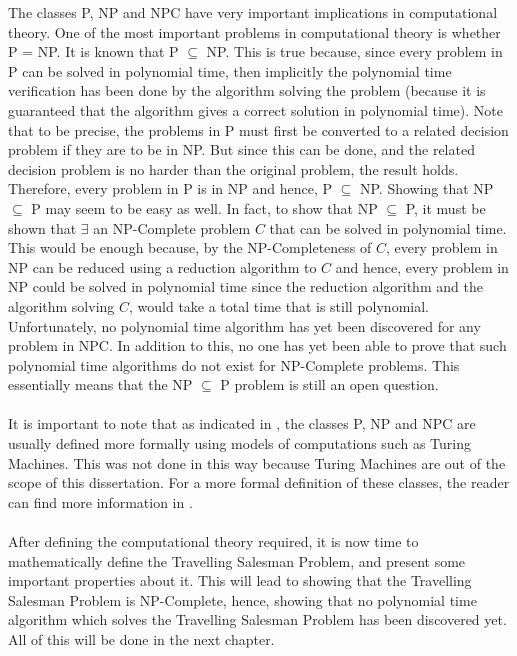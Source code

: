 \documentclass[12pt]{article}
\numberwithin{equation}{subsection}
\numberwithin{table}{subsection}
\numberwithin{algorithm}{subsection}
\numberwithin{figure}{subsection}
\begin{document}
The classes P, NP and NPC have very important implications in computational theory. One of the most important problems in computational theory is whether P = NP. It is known that P $\subseteq$ NP. This is true because, since every problem in P can be solved in polynomial time, then implicitly the polynomial time verification has been done by the algorithm solving the problem (because it is guaranteed that the algorithm gives a correct solution in polynomial time). Note that to be precise, the problems in P must first be converted to a related decision problem if they are to be in NP. But since this can be done, and the related decision problem is no harder than the original problem, the result holds. Therefore, every problem in P is in NP and hence, P $\subseteq$ NP. Showing that NP $\subseteq$ P may seem to be easy as well. In fact, to show that NP $\subseteq$ P, it must be shown that $\exists$ an NP-Complete problem $\mathit{C}$ that can be solved in polynomial time. This would be enough because, by the NP-Completeness of $\mathit{C}$, every problem in NP can be reduced using a reduction algorithm to $\mathit{C}$ and hence, every problem in NP could be solved in polynomial time since the reduction algorithm and the algorithm solving $\mathit{C}$, would take a total time that is still polynomial. Unfortunately, no polynomial time algorithm has yet been discovered for any problem in NPC. In addition to this, no one has yet been able to prove that such polynomial time algorithms do not exist for NP-Complete problems. This essentially means that the NP $\subseteq$ P problem is still an open question. \cite{cormen_leiserson_rivest_stein}\\\\
It is important to note that as indicated in \cite{dorigo_stutzle_thomas_2004}, the classes P, NP and NPC are usually defined more formally using models of computations such as Turing Machines. This was not done in this way because Turing Machines are out of the scope of this dissertation. For a more formal definition of these classes, the reader can find more information in \cite{garey_johnson_1979}.\\\\
After defining the computational theory required, it is now time to mathematically define the Travelling Salesman Problem, and present some important properties about it. This will lead to showing that the Travelling Salesman Problem is NP-Complete, hence, showing that no polynomial time algorithm which solves the Travelling Salesman Problem has been discovered yet. All of this will be done in the next chapter.
\end{document}

